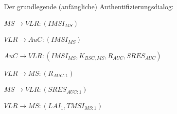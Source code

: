 \documentclass[a4paper]{article}
\begin{document}
\begin{multicols}{3}
      Der grundlegende (anfängliche) Authentifizierungsdialog:
      \begin{enumerate*}
            \def\labelenumi{\arabic{enumi}.}
            \item $MS \rightarrow VLR: (IMSI_{MS})$
            \item $VLR \rightarrow AuC: (IMSI_{MS})$
            \item $AuC \rightarrow VLR: (IMSI_{MS}, K_{BSC,MS},
                  R_{AUC}, SRES_{AUC})$
            \item $VLR \rightarrow MS: (R_{AUC:1})$
            \item $MS \rightarrow VLR: (SRES_{AUC:1})$
            \item $VLR \rightarrow MS: (LAI_1 , TMSI_{MS:1})$
      \end{enumerate*}


\end{multicols}
\end{document}
